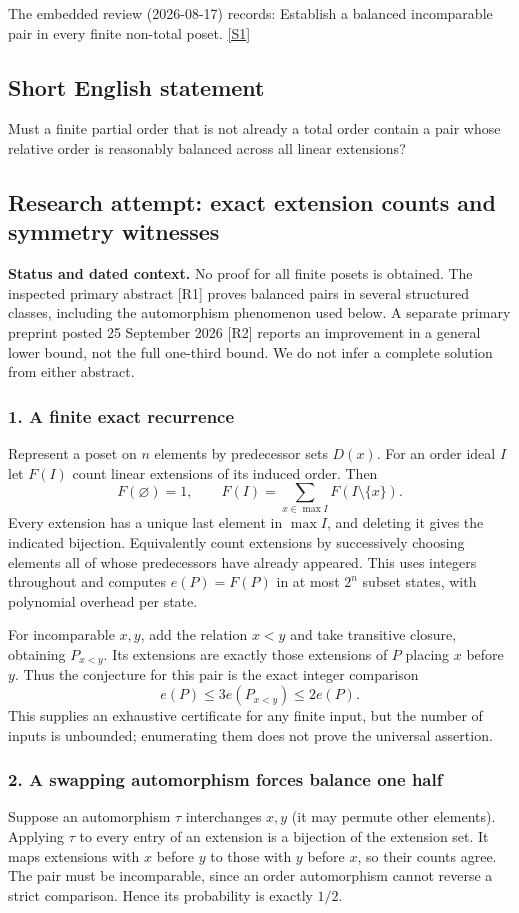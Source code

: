 \documentclass[11pt,a4paper]{article}
\newcommand{\sref}[2]{\hyperlink{source:#1:#2}{[S#2]}}
\begin{document}
The embedded review (2026-08-17) records: Establish a balanced incomparable pair in every finite non-total poset. \sref{statement}{1}

\subsection{Short English statement}

Must a finite partial order that is not already a total order contain a pair whose relative order is reasonably balanced across all linear extensions?

\subsection{Research attempt: exact extension counts and symmetry witnesses}
\textbf{Status and dated context.} No proof for all finite posets is obtained. The inspected primary abstract [R1] proves balanced pairs in several structured classes, including the automorphism phenomenon used below. A separate primary preprint posted 25 September 2026 [R2] reports an improvement in a general lower bound, not the full one-third bound. We do not infer a complete solution from either abstract.

\subsubsection{1. A finite exact recurrence}
Represent a poset on $n$ elements by predecessor sets $D(x)$. For an order ideal $I$ let $F(I)$ count linear extensions of its induced order. Then
\[F(\varnothing)=1,\qquad F(I)=\sum_{x\in\max I}F(I\setminus\{x\}).\tag{1}\]
Every extension has a unique last element in $\max I$, and deleting it gives the indicated bijection. Equivalently count extensions by successively choosing elements all of whose predecessors have already appeared. This uses integers throughout and computes $e(P)=F(P)$ in at most $2^n$ subset states, with polynomial overhead per state.

For incomparable $x,y$, add the relation $x<y$ and take transitive closure, obtaining $P_{x<y}$. Its extensions are exactly those extensions of $P$ placing $x$ before $y$. Thus the conjecture for this pair is the exact integer comparison
\[e(P)\leq3e(P_{x<y})\leq2e(P).\tag{2}\]
This supplies an exhaustive certificate for any finite input, but the number of inputs is unbounded; enumerating them does not prove the universal assertion.

\subsubsection{2. A swapping automorphism forces balance one half}
Suppose an automorphism $\tau$ interchanges $x,y$ (it may permute other elements). Applying $\tau$ to every entry of an extension is a bijection of the extension set. It maps extensions with $x$ before $y$ to those with $y$ before $x$, so their counts agree. The pair must be incomparable, since an order automorphism cannot reverse a strict comparison. Hence its probability is exactly $1/2$.
\end{document}
